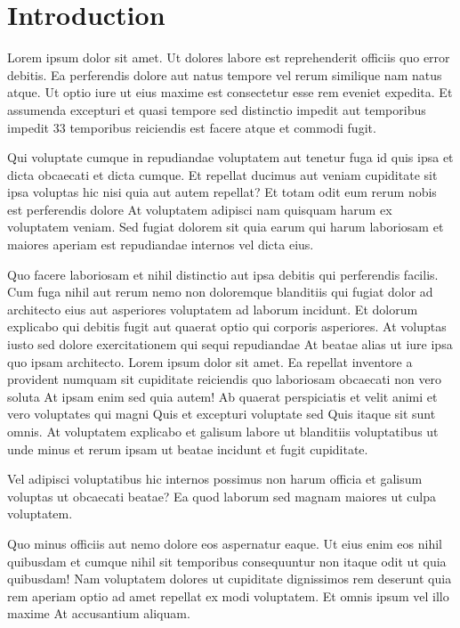 \chapter{Introduction}
\label{c:intro}



Lorem ipsum dolor sit amet. Ut dolores labore est reprehenderit officiis quo error debitis. Ea perferendis dolore aut natus tempore vel rerum similique nam natus atque. Ut optio iure ut eius maxime est consectetur esse rem eveniet expedita. Et assumenda excepturi et quasi tempore sed distinctio impedit aut temporibus impedit 33 temporibus reiciendis est facere atque et commodi fugit.

Qui voluptate cumque in repudiandae voluptatem aut tenetur fuga id quis ipsa et dicta obcaecati et dicta cumque. Et repellat ducimus aut veniam cupiditate sit ipsa voluptas hic nisi quia aut autem repellat? Et totam odit eum rerum nobis est perferendis dolore At voluptatem adipisci nam quisquam harum ex voluptatem veniam. Sed fugiat dolorem sit quia earum qui harum laboriosam et maiores aperiam est repudiandae internos vel dicta eius.

Quo facere laboriosam et nihil distinctio aut ipsa debitis qui perferendis facilis. Cum fuga nihil aut rerum nemo non doloremque blanditiis qui fugiat dolor ad architecto eius aut asperiores voluptatem ad laborum incidunt. Et dolorum explicabo qui debitis fugit aut quaerat optio qui corporis asperiores. At voluptas iusto sed dolore exercitationem qui sequi repudiandae At beatae alias ut iure ipsa quo ipsam architecto.
Lorem ipsum dolor sit amet. Ea repellat inventore a provident numquam sit cupiditate reiciendis quo laboriosam obcaecati non vero soluta At ipsam enim sed quia autem! Ab quaerat perspiciatis et velit animi et vero voluptates qui magni Quis et excepturi voluptate sed Quis itaque sit sunt omnis. At voluptatem explicabo et galisum labore ut blanditiis voluptatibus ut unde minus et rerum ipsam ut beatae incidunt et fugit cupiditate.

Vel adipisci voluptatibus hic internos possimus non harum officia et galisum voluptas ut obcaecati beatae? Ea quod laborum sed magnam maiores ut culpa voluptatem.

Quo minus officiis aut nemo dolore eos aspernatur eaque. Ut eius enim eos nihil quibusdam et cumque nihil sit temporibus consequuntur non itaque odit ut quia quibusdam! Nam voluptatem dolores ut cupiditate dignissimos rem deserunt quia rem aperiam optio ad amet repellat ex modi voluptatem. Et omnis ipsum vel illo maxime At accusantium aliquam.


